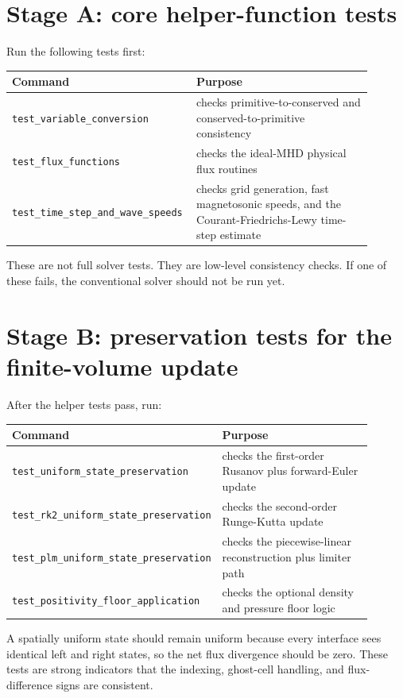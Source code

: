 \documentclass[11pt]{article}
\begin{document}
\section{Stage A: core helper-function tests}
Run the following tests first:
\begin{center}
\begin{tabular}{p{0.42\linewidth} p{0.48\linewidth}}
\toprule
\textbf{Command} & \textbf{Purpose} \\
\midrule
\texttt{test\_variable\_conversion} & checks primitive-to-conserved and conserved-to-primitive consistency \\
\texttt{test\_flux\_functions} & checks the ideal-MHD physical flux routines \\
\texttt{test\_time\_step\_and\_wave\_speeds} & checks grid generation, fast magnetosonic speeds, and the Courant-Friedrichs-Lewy time-step estimate \\
\bottomrule
\end{tabular}
\end{center}

These are not full solver tests. They are low-level consistency checks. If one of these fails, the conventional solver should not be run yet.

\section{Stage B: preservation tests for the finite-volume update}
After the helper tests pass, run:
\begin{center}
\begin{tabular}{p{0.42\linewidth} p{0.48\linewidth}}
\toprule
\textbf{Command} & \textbf{Purpose} \\
\midrule
\texttt{test\_uniform\_state\_preservation} & checks the first-order Rusanov plus forward-Euler update \\
\texttt{test\_rk2\_uniform\_state\_preservation} & checks the second-order Runge-Kutta update \\
\texttt{test\_plm\_uniform\_state\_preservation} & checks the piecewise-linear reconstruction plus limiter path \\
\texttt{test\_positivity\_floor\_application} & checks the optional density and pressure floor logic \\
\bottomrule
\end{tabular}
\end{center}

A spatially uniform state should remain uniform because every interface sees identical left and right states, so the net flux divergence should be zero. These tests are strong indicators that the indexing, ghost-cell handling, and flux-difference signs are consistent.
\end{document}
